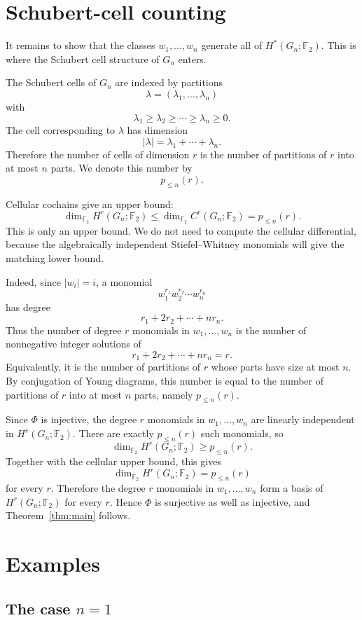 \documentclass[11pt]{article}
\newcommand{\F}{\mathbb F}
\theoremstyle{plain}
\theoremstyle{definition}
\numberwithin{equation}{section}
\begin{document}
\section{Schubert-cell counting}

It remains to show that the classes $w_1,\ldots,w_n$ generate all of $H^*(G_n;\F_2)$.  This is where the Schubert cell structure of $G_n$ enters.

The Schubert cells of $G_n$ are indexed by partitions
\[
  \lambda=(\lambda_1,\ldots,\lambda_n)
\]
with
\[
  \lambda_1\geq \lambda_2\geq\cdots\geq \lambda_n\geq 0.
\]
The cell corresponding to $\lambda$ has dimension
\[
  |\lambda|=\lambda_1+\cdots+\lambda_n.
\]
Therefore the number of cells of dimension $r$ is the number of partitions of $r$ into at most $n$ parts.  We denote this number by
\[
  p_{\leq n}(r).
\]

Cellular cochains give an upper bound:
\[
  \dim_{\F_2}H^r(G_n;\F_2)
  \leq
  \dim_{\F_2}C^r(G_n;\F_2)
  =
  p_{\leq n}(r).
\]
This is only an upper bound.  We do not need to compute the cellular differential, because the algebraically independent Stiefel--Whitney monomials will give the matching lower bound.

Indeed, since $|w_i|=i$, a monomial
\[
  w_1^{r_1}w_2^{r_2}\cdots w_n^{r_n}
\]
has degree
\[
  r_1+2r_2+\cdots+nr_n.
\]
Thus the number of degree $r$ monomials in $w_1,\ldots,w_n$ is the number of nonnegative integer solutions of
\[
  r_1+2r_2+\cdots+nr_n=r.
\]
Equivalently, it is the number of partitions of $r$ whose parts have size at most $n$.  By conjugation of Young diagrams, this number is equal to the number of partitions of $r$ into at most $n$ parts, namely $p_{\leq n}(r)$.

Since $\Phi$ is injective, the degree $r$ monomials in $w_1,\ldots,w_n$ are linearly independent in $H^r(G_n;\F_2)$.  There are exactly $p_{\leq n}(r)$ such monomials, so
\[
  \dim_{\F_2}H^r(G_n;\F_2)
  \geq
  p_{\leq n}(r).
\]
Together with the cellular upper bound, this gives
\[
  \dim_{\F_2}H^r(G_n;\F_2)
  =
  p_{\leq n}(r)
\]
for every $r$.  Therefore the degree $r$ monomials in $w_1,\ldots,w_n$ form a basis of $H^r(G_n;\F_2)$ for every $r$.  Hence $\Phi$ is surjective as well as injective, and Theorem~\ref{thm:main} follows.

\section{Examples}

\subsection{The case $n=1$}
\end{document}

